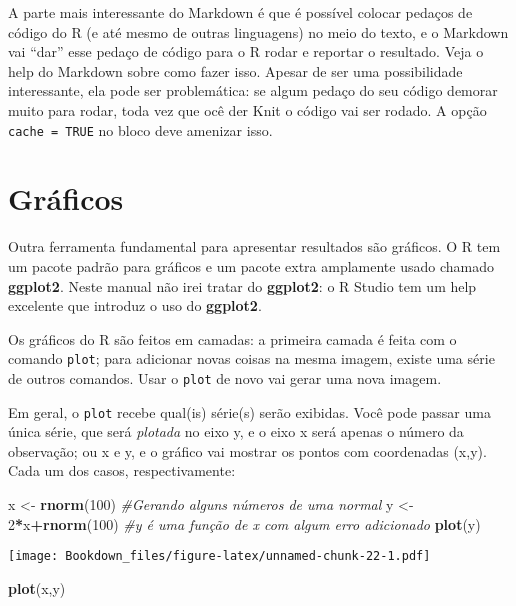 \documentclass[]{book}
\newenvironment{Shaded}{\begin{snugshade}}{\end{snugshade}}
\newcommand{\KeywordTok}[1]{\textcolor[rgb]{0.13,0.29,0.53}{\textbf{#1}}}
\newcommand{\DecValTok}[1]{\textcolor[rgb]{0.00,0.00,0.81}{#1}}
\newcommand{\StringTok}[1]{\textcolor[rgb]{0.31,0.60,0.02}{#1}}
\newcommand{\CommentTok}[1]{\textcolor[rgb]{0.56,0.35,0.01}{\textit{#1}}}
\newcommand{\OperatorTok}[1]{\textcolor[rgb]{0.81,0.36,0.00}{\textbf{#1}}}
\newcommand{\NormalTok}[1]{#1}
\begin{document}
A parte mais interessante do Markdown é que é possível colocar pedaços
de código do R (e até mesmo de outras linguagens) no meio do texto, e o
Markdown vai ``dar'' esse pedaço de código para o R rodar e reportar o
resultado. Veja o help do Markdown sobre como fazer isso. Apesar de ser
uma possibilidade interessante, ela pode ser problemática: se algum
pedaço do seu código demorar muito para rodar, toda vez que ocê der Knit
o código vai ser rodado. A opção \texttt{cache\ =\ TRUE} no bloco deve
amenizar isso.

\section{Gráficos}\label{graficos}

Outra ferramenta fundamental para apresentar resultados são gráficos. O
R tem um pacote padrão para gráficos e um pacote extra amplamente usado
chamado \textbf{ggplot2}. Neste manual não irei tratar do
\textbf{ggplot2}: o R Studio tem um help excelente que introduz o uso do
\textbf{ggplot2}.

Os gráficos do R são feitos em camadas: a primeira camada é feita com o
comando \texttt{plot}; para adicionar novas coisas na mesma imagem,
existe uma série de outros comandos. Usar o \texttt{plot} de novo vai
gerar uma nova imagem.

Em geral, o \texttt{plot} recebe qual(is) série(s) serão exibidas. Você
pode passar uma única série, que será \emph{plotada} no eixo y, e o eixo
x será apenas o número da observação; ou x e y, e o gráfico vai mostrar
os pontos com coordenadas (x,y). Cada um dos casos, respectivamente:

\begin{Shaded}
\begin{Highlighting}[]
\NormalTok{x <-}\StringTok{ }\KeywordTok{rnorm}\NormalTok{(}\DecValTok{100}\NormalTok{) }\CommentTok{#Gerando alguns números de uma normal}
\NormalTok{y <-}\StringTok{ }\DecValTok{2}\OperatorTok{*}\NormalTok{x}\OperatorTok{+}\KeywordTok{rnorm}\NormalTok{(}\DecValTok{100}\NormalTok{) }\CommentTok{#y é uma função de x com algum erro adicionado}
\KeywordTok{plot}\NormalTok{(y)}
\end{Highlighting}
\end{Shaded}

\texttt{[image: Bookdown\_files/figure-latex/unnamed-chunk-22-1.pdf]}

\begin{Shaded}
\begin{Highlighting}[]
\KeywordTok{plot}\NormalTok{(x,y)}
\end{Highlighting}
\end{Shaded}
\end{document}
